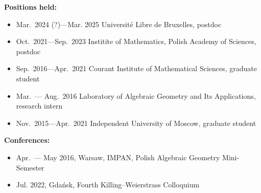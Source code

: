 \documentclass{article}
\begin{document}
\begin{description}
\item {\bf Positions held:} \begin{itemize}
     \item Mar.~2024 (?)---Mar.  2025 \hspace{2mm} Universit\'e Libre de Bruxelles,  postdoc
     \item Oct.~2021---Sep.~2023 \hspace{2mm} Institite of Mathematics,  Polish Academy of Sciences,  postdoc
     \item Sep.~2016---Apr.~2021 \hspace{2mm} Courant Institute of Mathematical Sciences,
     graduate student
     \item Mar.~--- Aug.~2016 \hspace{2mm} Laboratory of Algebraic Geometry
	and Its Applications, research intern
     \item Nov.~2015---Apr.~2021 \hspace{2mm} Independent University of Moscow,
     graduate student
\end{itemize}

\vspace{1mm}

\item {\bf Conferences:} \begin{itemize}
\item Apr.~--- May 2016,  Warsaw,  IMPAN,  Polish Algebraic Geometry Mini-Semester
\item Jul.  2022,  Gda\'nsk,  Fourth Killing--Weierstrass Colloquium
\end{itemize}

\vspace{1mm}


\end{description}
\end{document}
